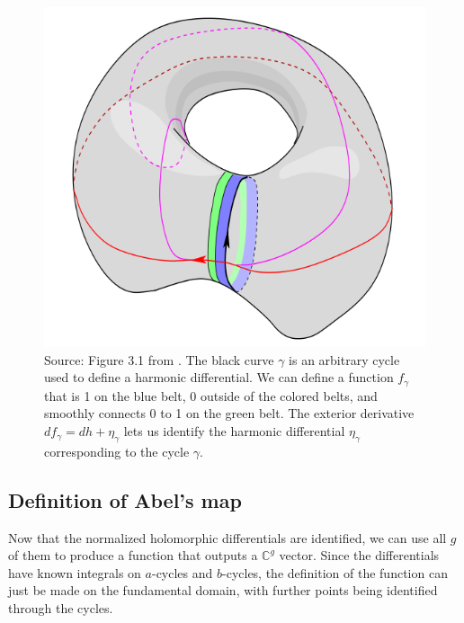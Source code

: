 \begin{figure}
    \center
    \includegraphics{assetsB12/HarmonicDifferential.png}
    \caption{Source: Figure 3.1 from \cite{Ber06}.
    The black curve $\gamma$ is an arbitrary cycle used to define a harmonic differential. We can define a function $f_\gamma$ that is 1 on the blue belt, 0 outside of the colored belts, and smoothly connects 0 to 1 on the green belt. The exterior derivative $df_\gamma=dh+\eta_\gamma$ lets us identify the harmonic differential $\eta_\gamma$ corresponding to the cycle $\gamma$.}
    \label{figB12:Harmonic}
\end{figure}

\subsection{Definition of Abel's map}

Now that the normalized holomorphic differentials are identified, we can use all $g$ of them to produce a function that outputs a $\mathbb C^g$ vector. Since the differentials have known integrals on $a$-cycles and $b$-cycles, the definition of the function can just be made on the fundamental domain, with further points being identified through the cycles.

